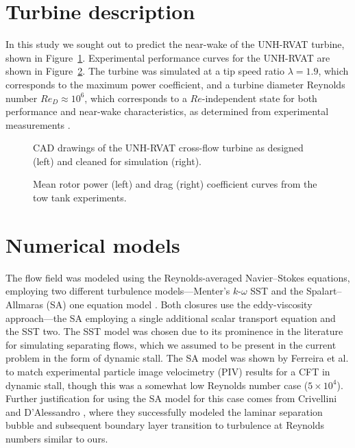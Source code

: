 \section{Turbine description}

In this study we sought out to predict the near-wake of the UNH-RVAT turbine,
shown in Figure~\ref{fig:RVAT-CAD}. Experimental performance curves for the
UNH-RVAT are shown in Figure~\ref{fig:exp_perf}. The turbine was simulated at a
tip speed ratio $\lambda=1.9$, which corresponds to the maximum power
coefficient, and a turbine diameter Reynolds number $Re_D \approx 10^6$, which
corresponds to a $Re$-independent state for both performance and near-wake
characteristics, as determined from experimental measurements \cite{Bachant2014,
    Bachant2016-Energies}.


\begin{figure}[ht]
    \centering


    \caption{CAD drawings of the UNH-RVAT cross-flow turbine as designed (left)
        and cleaned for simulation (right).}

    \label{fig:RVAT-CAD}
\end{figure}


\begin{figure}[ht]
    \centering


    \caption{Mean rotor power (left) and drag (right) coefficient curves from
        the tow tank experiments\cite{Bachant2016-RVAT-Re-dep}.}

    \label{fig:exp_perf}
\end{figure}


\section{Numerical models}

The flow field was modeled using the Reynolds-averaged Navier--Stokes equations,
employing two different turbulence models---Menter's $k$-$\omega$ SST
\cite{Menter1994} and the Spalart--Allmaras (SA) one equation model
\cite{Spalart1992}. Both closures use the eddy-viscosity approach---the SA
employing a single additional scalar transport equation and the SST two. The SST
model was chosen due to its prominence in the literature for simulating
separating flows, which we assumed to be present in the current problem in the
form of dynamic stall. The SA model was shown by Ferreira et al.
\cite{Ferreira2007} to match experimental particle image velocimetry (PIV)
results for a CFT in dynamic stall, though this was a somewhat low Reynolds
number case ($5 \times 10^4$). Further justification for using the SA model for
this case comes from Crivellini and D'Alessandro \cite{Crivellini2014}, where
they successfully modeled the laminar separation bubble and subsequent boundary
layer transition to turbulence at Reynolds numbers similar to ours.


